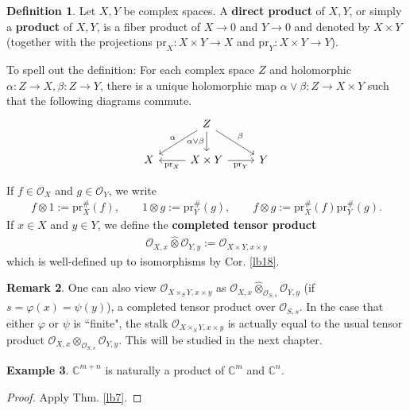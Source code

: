 \documentclass[12pt,b5paper,notitlepage]{report}
\theoremstyle{definition}
\newtheorem{df}{Definition}[section]
\newtheorem{eg}[df]{Example}
\newtheorem{rem}[df]{Remark}
\theoremstyle{plain}
\newcommand{\wht}{\widehat}
\newcommand{\scr}{\mathscr}
\newcommand{\Cbb}{\mathbb C}
\newcommand{\pr}{\mathrm {pr}}
\numberwithin{equation}{section}
\begin{document}
\begin{df}
Let $X,Y$ be complex spaces. A \textbf{direct product} of $X,Y$, or simply a \textbf{product} of $X,Y$, is a fiber product of $X\rightarrow 0$ and $Y\rightarrow 0$ and denoted by $X\times Y$ (together with the projections $\pr_X:X\times Y\rightarrow X$ and $\pr_Y:X\times Y\rightarrow Y$).

To spell out the definition: For each complex space $Z$ and holomorphic $\alpha:Z\rightarrow X,\beta:Z\rightarrow Y$, there is a unique holomorphic map $\alpha\vee\beta:Z\rightarrow X\times Y$ such that the following diagrams commute.
\begin{equation*}
\begin{tikzcd}
  & Z \arrow[ld, "\alpha"'] \arrow[rd, "\beta"] \arrow[d,"\alpha\vee\beta"'] &   \\
X & X\times Y \arrow[l, "\pr_X"] \arrow[r, "\pr_Y"']              & Y
\end{tikzcd}
\end{equation*}

If $f\in\scr O_X$ and $g\in\scr O_Y$, we write \index{fg@$f\otimes g\in\scr O_{X\times Y}$}
\begin{align*}
f\otimes 1:=\pr_X^\#(f),\qquad 1\otimes g:=\pr_Y^\#(g),\qquad f\otimes g:=\pr_X^\#(f)\pr_Y^\#(g).
\end{align*}
If $x\in X$ and $y\in Y$, we define the \textbf{completed tensor product}
\begin{align*}
\scr O_{X,x}\wht\otimes\scr O_{Y,y}:=\scr O_{X\times Y,x\times y}
\end{align*}
which is well-defined up to isomorphisms by Cor. \ref{lb18}.\hfill\qedsymbol
\end{df}


\begin{rem}
One can also view $\scr O_{X\times_SY,x\times y}$ as $\scr O_{X,x}\wht\otimes_{\scr O_{S,s}}\scr O_{Y,y}$ (if $s=\varphi(x)=\psi(y)$), a completed tensor product over  $\scr O_{S,s}$. In the case that either $\varphi$ or $\psi$ is ``finite", the stalk $\scr O_{X\times_SY,x\times y}$ is actually equal to the usual tensor product $\scr O_{X,x}\otimes_{\scr O_{S,s}}\scr O_{Y,y}$. This will be studied in the next chapter. 
\end{rem}


\begin{eg}
$\Cbb^{m+n}$ is naturally a product of $\Cbb^m$ and $\Cbb^n$.
\end{eg}

\begin{proof}
Apply Thm. \ref{lb7}.
\end{proof}
\end{document}
